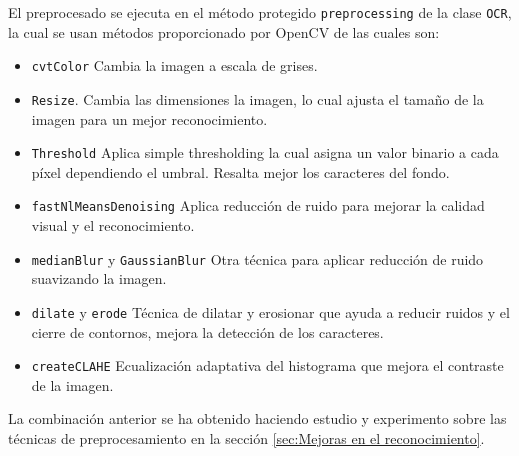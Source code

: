 El preprocesado se ejecuta en el método protegido \texttt{preprocessing} de la clase \texttt{OCR}, la cual se usan métodos proporcionado por OpenCV de las cuales son:
\begin{itemize}
	\item \texttt{cvtColor} Cambia la imagen a escala de grises.
	\item \texttt{Resize}. Cambia las dimensiones la imagen, lo cual ajusta el tamaño de la imagen para un mejor reconocimiento.
	\item \texttt{Threshold} Aplica simple thresholding la cual asigna un valor binario a cada píxel dependiendo el umbral. Resalta mejor los caracteres del fondo.
	\item \texttt{fastNlMeansDenoising} Aplica reducción de ruido para mejorar la calidad visual y el reconocimiento.
	\item \texttt{medianBlur} y \texttt{GaussianBlur} Otra técnica para aplicar reducción de ruido suavizando la imagen.
	\item \texttt{dilate} y \texttt{erode} Técnica de dilatar y erosionar que ayuda a reducir ruidos y el cierre de contornos, mejora la detección de los caracteres.
	\item \texttt{createCLAHE} Ecualización adaptativa del histograma que mejora el contraste de la imagen.
\end{itemize}
La combinación anterior se ha obtenido haciendo estudio y experimento sobre las técnicas de preprocesamiento en la sección \ref{sec:Mejoras en el reconocimiento}.

